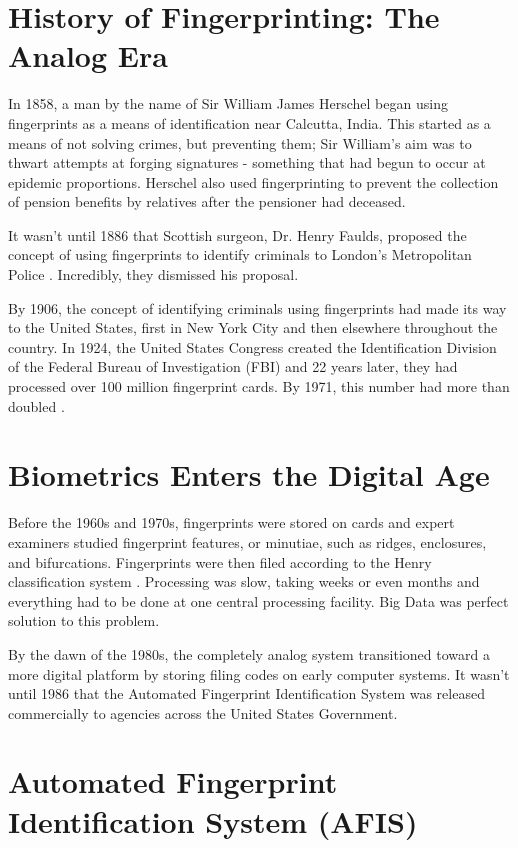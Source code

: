\documentclass[sigconf]{acmart}
\begin{document}
\section{History of Fingerprinting: The Analog Era}

In 1858, a man by the name of Sir William James Herschel began using fingerprints as a means of identification \cite{Herschel1916} near Calcutta, India. This started as a means of not solving crimes, but preventing them; Sir William's aim was to thwart attempts at forging signatures - something that had begun to occur at epidemic proportions. Herschel also used fingerprinting to prevent the collection of pension benefits by relatives after the pensioner had deceased. 

It wasn't until 1886 that Scottish surgeon, Dr. Henry Faulds, proposed the concept of using fingerprints to identify criminals to London's Metropolitan Police \cite{Faulds1880}. Incredibly, they dismissed his proposal. 

By 1906, the concept of identifying criminals using fingerprints had made its way to the United States, first in New York City and then elsewhere throughout the country. In 1924, the United States Congress created the Identification Division of the Federal Bureau of Investigation (FBI) and 22 years later, they had processed over 100 million fingerprint cards. By 1971, this number had more than doubled \cite{USMarshals2017}.

\section{Biometrics Enters the Digital Age}

Before the 1960s and 1970s, fingerprints were stored on cards and expert examiners studied fingerprint features, or minutiae, such as ridges, enclosures, and bifurcations. Fingerprints were then filed according to the Henry classification system \cite{Cole2002}. Processing was slow, taking weeks or even months and everything had to be done at one central processing facility. Big Data was perfect solution to this problem.

By the dawn of the 1980s, the completely analog system transitioned toward a more digital platform by storing filing codes on early computer systems. It wasn't until 1986 that the Automated Fingerprint Identification System was released commercially to agencies across the United States Government. 

\section{Automated Fingerprint Identification System (AFIS)}
\end{document}
